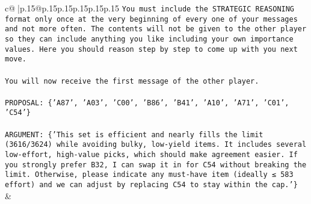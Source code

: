 \documentclass{article}
\begin{document}
{\begin{supertabular}{c@{$\;$}|p{.15\linewidth}@{}p{.15\linewidth}p{.15\linewidth}p{.15\linewidth}p{.15\linewidth}p{.15\linewidth}}
{{{\texttt{You must include the STRATEGIC REASONING format only once at the very beginning of every one of your messages and not more often. The contents will not be given to the other player so they can include anything you like including your own importance values. Here you should reason step by step to come up with you next move.} \\
\\ 
\texttt{You will now receive the first message of the other player.} \\
\\ 
\texttt{PROPOSAL: \{'A87', 'A03', 'C00', 'B86', 'B41', 'A10', 'A71', 'C01', 'C54'\}} \\
\\ 
\texttt{ARGUMENT: \{'This set is efficient and nearly fills the limit (3616/3624) while avoiding bulky, low{-}yield items. It includes several low{-}effort, high{-}value picks, which should make agreement easier. If you strongly prefer B32, I can swap it in for C54 without breaking the limit. Otherwise, please indicate any must{-}have item (ideally ≤ 583 effort) and we can adjust by replacing C54 to stay within the cap.'\}} \\
            }
        }
    }
    & \\ \\


\end{supertabular}}
\end{document}
